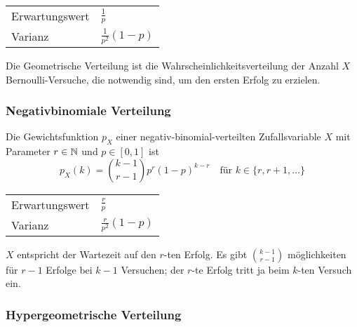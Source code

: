 \begin{highlight}
	\begin{tabular}{l@{ : }l}
		Erwartungswert & \(\frac{1}{p}\)        \\
		Varianz        & \(\frac{1}{p^2}(1-p)\)
	\end{tabular}
\end{highlight}

\begin{example}[Wartezeit]
	Die Geometrische Verteilung ist die Wahrscheinlichkeitsverteilung der Anzahl \(X\) Bernoulli-Versuche,
	die notwendig sind, um den ersten Erfolg zu erzielen.
\end{example}




\subsubsection{Negativbinomiale Verteilung}

Die Gewichtsfunktion \(p_X\) einer negativ-binomial-verteilten Zufallsvariable \(X\) mit Parameter \(r \in \mathbb{N}\) und \(p \in [0,1]\) ist
\[
	p_X(k) = {{k-1} \choose {r-1}}p^r(1-p)^{k-r}
	\quad
	\text{für } k \in \{r,r+1,\ldots\}
\]

\begin{highlight}
	\begin{tabular}{l@{ : }l}
		Erwartungswert & \(\frac{r}{p}\)        \\
		Varianz        & \(\frac{r}{p^2}(1-p)\)
	\end{tabular}
\end{highlight}

\(X\) entspricht der Wartezeit auf den \(r\)-ten Erfolg. Es gibt \({{k-1} \choose {r-1}}\) möglichkeiten für \(r-1\) Erfolge bei \(k-1\) Versuchen; der \(r\)-te Erfolg tritt ja beim \(k\)-ten Versuch ein.




\subsubsection{Hypergeometrische Verteilung}

